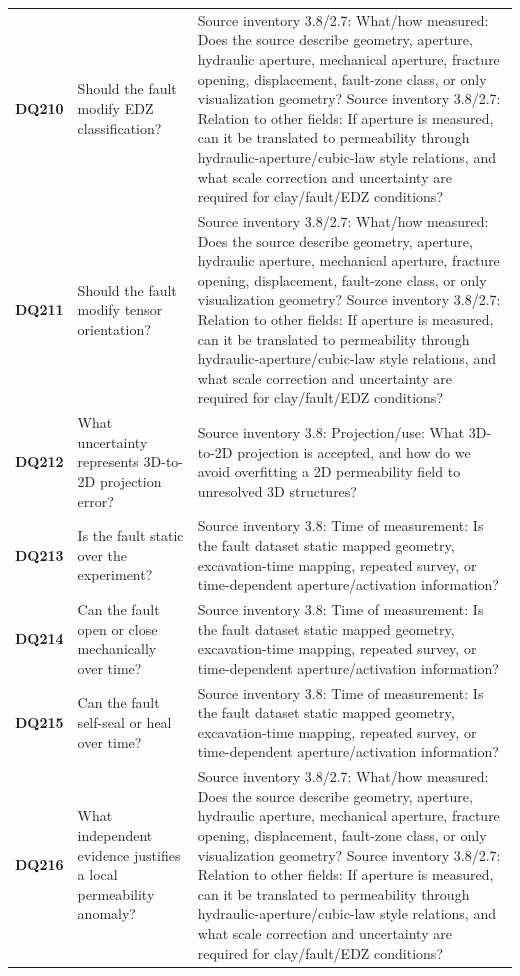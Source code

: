 \begin{longtable}{@{}L{0.09\textwidth} L{0.31\textwidth} L{0.52\textwidth}@{}}
\addlinespace[0.18em]
\textbf{DQ210} & Should the fault modify EDZ classification? & Source inventory 3.8/2.7: What/how measured: Does the source describe geometry, aperture, hydraulic aperture, mechanical aperture, fracture opening, displacement, fault-zone class, or only visualization geometry? Source inventory 3.8/2.7: Relation to other fields: If aperture is measured, can it be translated to permeability through hydraulic-aperture/cubic-law style relations, and what scale correction and uncertainty are required for clay/fault/EDZ conditions?\\
\addlinespace[0.18em]
\textbf{DQ211} & Should the fault modify tensor orientation? & Source inventory 3.8/2.7: What/how measured: Does the source describe geometry, aperture, hydraulic aperture, mechanical aperture, fracture opening, displacement, fault-zone class, or only visualization geometry? Source inventory 3.8/2.7: Relation to other fields: If aperture is measured, can it be translated to permeability through hydraulic-aperture/cubic-law style relations, and what scale correction and uncertainty are required for clay/fault/EDZ conditions?\\
\addlinespace[0.18em]
\textbf{DQ212} & What uncertainty represents 3D-to-2D projection error? & Source inventory 3.8: Projection/use: What 3D-to-2D projection is accepted, and how do we avoid overfitting a 2D permeability field to unresolved 3D structures?\\
\addlinespace[0.18em]
\textbf{DQ213} & Is the fault static over the experiment? & Source inventory 3.8: Time of measurement: Is the fault dataset static mapped geometry, excavation-time mapping, repeated survey, or time-dependent aperture/activation information?\\
\addlinespace[0.18em]
\textbf{DQ214} & Can the fault open or close mechanically over time? & Source inventory 3.8: Time of measurement: Is the fault dataset static mapped geometry, excavation-time mapping, repeated survey, or time-dependent aperture/activation information?\\
\addlinespace[0.18em]
\textbf{DQ215} & Can the fault self-seal or heal over time? & Source inventory 3.8: Time of measurement: Is the fault dataset static mapped geometry, excavation-time mapping, repeated survey, or time-dependent aperture/activation information?\\
\addlinespace[0.18em]
\textbf{DQ216} & What independent evidence justifies a local permeability anomaly? & Source inventory 3.8/2.7: What/how measured: Does the source describe geometry, aperture, hydraulic aperture, mechanical aperture, fracture opening, displacement, fault-zone class, or only visualization geometry? Source inventory 3.8/2.7: Relation to other fields: If aperture is measured, can it be translated to permeability through hydraulic-aperture/cubic-law style relations, and what scale correction and uncertainty are required for clay/fault/EDZ conditions?\\

\end{longtable}
